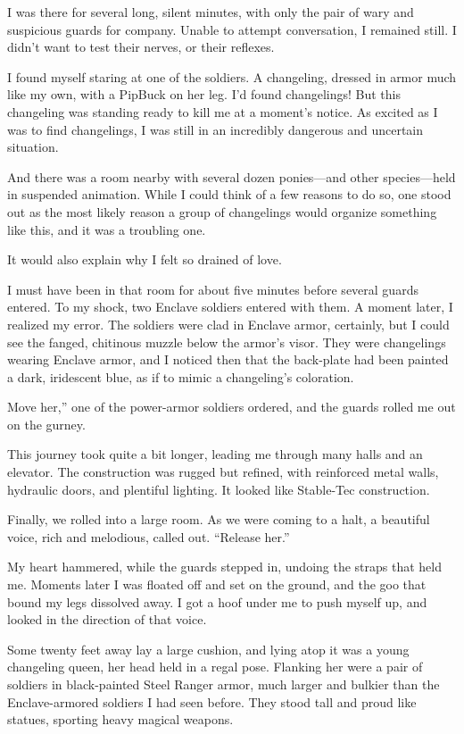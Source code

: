 I was there for several long, silent minutes, with only the pair of wary and suspicious guards for company. Unable to attempt conversation, I remained still. I didn’t want to test their nerves, or their reflexes.

I found myself staring at one of the soldiers. A changeling, dressed in armor much like my own, with a PipBuck on her leg. I’d found changelings! But this changeling was standing ready to kill me at a moment’s notice. As excited as I was to find changelings, I was still in an incredibly dangerous and uncertain situation.

And there was a room nearby with several dozen ponies—and other species—held in suspended animation. While I could think of a few reasons to do so, one stood out as the most likely reason a group of changelings would organize something like this, and it was a troubling one.

It would also explain why I felt so drained of love.

I must have been in that room for about five minutes before several guards entered. To my shock, two Enclave soldiers entered with them. A moment later, I realized my error. The soldiers were clad in Enclave armor, certainly, but I could see the fanged, chitinous muzzle below the armor’s visor. They were changelings wearing Enclave armor, and I noticed then that the back-plate had been painted a dark, iridescent blue, as if to mimic a changeling’s coloration.

\leavevmode{}Move her,” one of the power-armor soldiers ordered, and the guards rolled me out on the gurney.

This journey took quite a bit longer, leading me through many halls and an elevator. The construction was rugged but refined, with reinforced metal walls, hydraulic doors, and plentiful lighting. It looked like Stable-Tec construction.

Finally, we rolled into a large room. As we were coming to a halt, a beautiful voice, rich and melodious, called out. “Release her.”

My heart hammered, while the guards stepped in, undoing the straps that held me. Moments later I was floated off and set on the ground, and the goo that bound my legs dissolved away. I got a hoof under me to push myself up, and looked in the direction of that voice.

Some twenty feet away lay a large cushion, and lying atop it was a young changeling queen, her head held in a regal pose. Flanking her were a pair of soldiers in black-painted Steel Ranger armor, much larger and bulkier than the Enclave-armored soldiers I had seen before. They stood tall and proud like statues, sporting heavy magical weapons.

